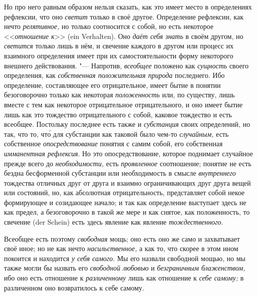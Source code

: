 Но про него равным образом нельзя сказать, как это имеет место в определениях
рефлексии, что оно {\em светит} только в своё другое. Определение рефлексии,
как нечто {\em релятивное,} но только соотносится с собой, но есть некоторое
<<{\em отношение к}>> (ein Verhalten). Оно {\em даёт себя знать} в своём
другом, но {\em светится} только лишь в нём, и свечение каждого в другом или
процесс их взаимного определения имеет при их самостоятельности форму
некоторого внешнего действования. "--- Напротив, {\em всеобщее} положено как
{\em сущность} своего определения, как {\em собственная положительная природа}
последнего. Ибо определение, составляющее его отрицательное, имеет бытие в
понятии безоговорочно только как некоторая {\em положенность} или, по существу,
лишь вместе с тем как некоторое отрицательное отрицательного, и оно имеет бытие
лишь как это тождество отрицательного с собой, каковое тождество и есть
всеобщее. Постольку последнее есть также и {\em субстанция} своих определений,
но так, что то, чт\'{о} для субстанции как таковой было чем-то {\em случайным,}
есть собственное {\em опосредствование} понятия с самим собой, его собственная
{\em имманентная рефлексия}. Но это опосредствование, которое поднимает
случайное прежде всего до {\em необходимости,} есть {\em проявленное}
соотношение; понятие не есть бездна бесформенной субстанции или необходимость в
смысле {\em внутреннего} тождества отличных друг от друга и взаимно
ограничивающих друг друга вещей или состояний, но, как абсолютная отрицательность,
представляет собой некое формирующее и созидающее начало; и так как определение
выступает здесь не как предел, а безоговорочно в такой же мере и как снятое,
как положенность, то свечение (der Schein) есть здесь явление как явление
{\em тождественного}.

Всеобщее есть поэтому {\em свободная} мощь; оно есть оно же само и захватывает
своё иное; но не как нечто {\em насильственное,} а как то, что скорее в этом
ином покоится и находится {\em у себя самого}. Мы его назвали свободной мощью,
но мы также могли бы назвать его {\em свободной любовью} и {\em безграничным
блаженством,} ибо оно есть отношение к {\em различенному} лишь как отношение
к {\em себе самому;} в различенном оно возвратилось к себе самому.

